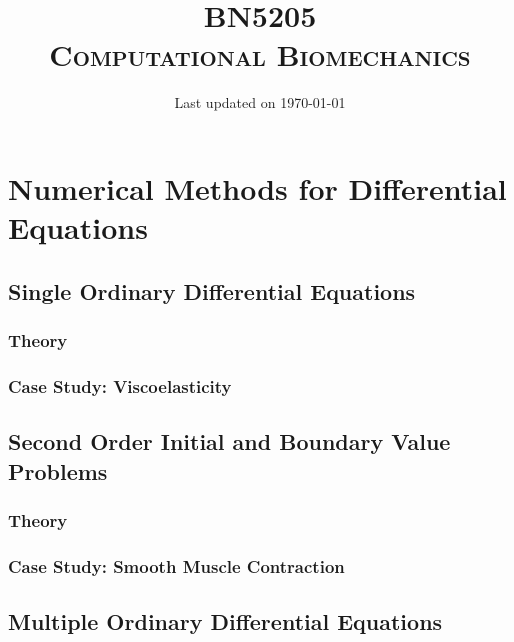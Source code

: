 \documentclass[a4paper, 11pt, oneside]{bookest}
\title{\textsc{BN5205 \\ \bigskip Computational Biomechanics}}
\author{}
\date{Last updated on \today}
\theoremstyle{definition}
\begin{document}
\frontmatter
\maketitle
\tableofcontents
%
%
\mainmatter
\part{Numerical Methods for Differential Equations}

\chapter{Single Ordinary Differential Equations}
\section{Theory}

\section{Case Study: Viscoelasticity}


\chapter{Second Order Initial and Boundary Value Problems}
\section{Theory}
\section{Case Study: Smooth Muscle Contraction}

\chapter{Multiple Ordinary Differential Equations}
\end{document}
